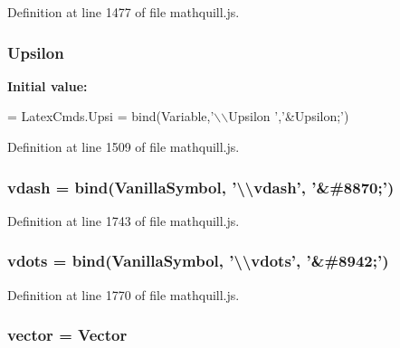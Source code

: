 Definition at line 1477 of file mathquill.\-js.

\subsubsection[{Upsilon}]{ Upsilon}\label{mathquill_8js_afe5c9f4d5d0207d831fd332842a16d83}
{\bfseries Initial value\-:}
\begin{DoxyCode}
= 
LatexCmds.Upsi = 
  bind(Variable,\textcolor{stringliteral}{'\(\backslash\)\(\backslash\)Upsilon '},\textcolor{stringliteral}{'&Upsilon;'})
\end{DoxyCode}


Definition at line 1509 of file mathquill.\-js.

\subsubsection[{vdash}]{ vdash = {\bf bind}({\bf Vanilla\-Symbol}, '\textbackslash{}\textbackslash{}vdash', '\&\#8870;')}\label{mathquill_8js_adbf028204b10263f2689b2dbc882ee6d}


Definition at line 1743 of file mathquill.\-js.

\subsubsection[{vdots}]{ vdots = {\bf bind}({\bf Vanilla\-Symbol}, '\textbackslash{}\textbackslash{}vdots', '\&\#8942;')}\label{mathquill_8js_ab9b379cfcc2b2bbca91dfbf0cdcef6c8}


Definition at line 1770 of file mathquill.\-js.

\subsubsection[{vector}]{ vector = {\bf Vector}}\label{mathquill_8js_a895e084e281b1812446bbbf51d39c70c}


